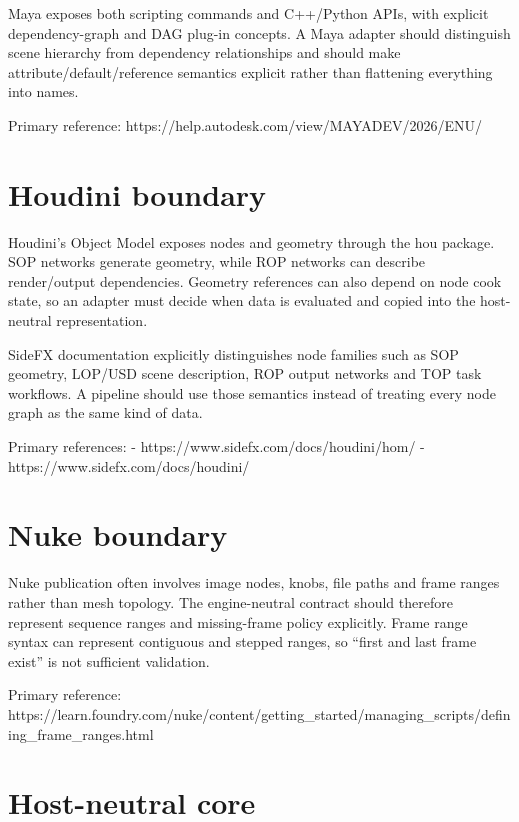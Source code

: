 Maya exposes both scripting commands and C++/Python APIs, with explicit dependency-graph and DAG plug-in concepts. A Maya adapter should distinguish scene hierarchy from dependency relationships and should make attribute/default/reference semantics explicit rather than flattening everything into names.

Primary reference: https://help.autodesk.com/view/MAYADEV/2026/ENU/

\section{Houdini boundary}\label{appendix-03ade9e1875f-houdini-boundary}

Houdini's Object Model exposes nodes and geometry through the hou package. SOP networks generate geometry, while ROP networks can describe render/output dependencies. Geometry references can also depend on node cook state, so an adapter must decide when data is evaluated and copied into the host-neutral representation.

SideFX documentation explicitly distinguishes node families such as SOP geometry, LOP/USD scene description, ROP output networks and TOP task workflows. A pipeline should use those semantics instead of treating every node graph as the same kind of data.

Primary references: - https://www.sidefx.com/docs/houdini/hom/ - https://www.sidefx.com/docs/houdini/

\section{Nuke boundary}\label{appendix-03ade9e1875f-nuke-boundary}

Nuke publication often involves image nodes, knobs, file paths and frame ranges rather than mesh topology. The engine-neutral contract should therefore represent sequence ranges and missing-frame policy explicitly. Frame range syntax can represent contiguous and stepped ranges, so ``first and last frame exist'' is not sufficient validation.

Primary reference: https://learn.foundry.com/nuke/content/getting\_started/managing\_scripts/defining\_frame\_ranges.html

\section{Host-neutral core}\label{appendix-03ade9e1875f-host-neutral-core}

